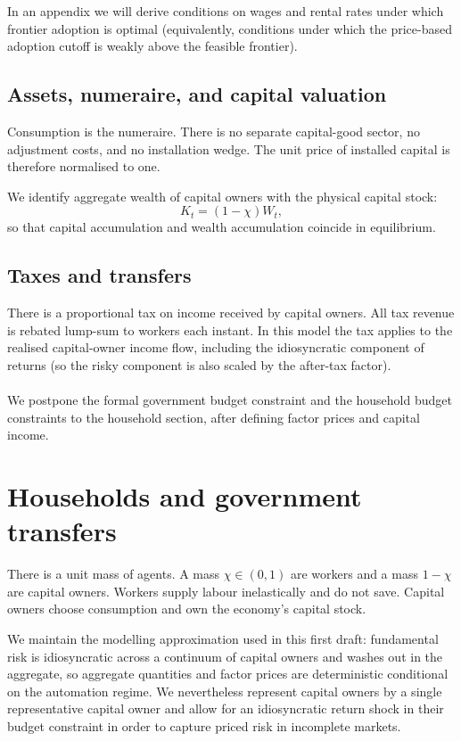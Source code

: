\documentclass{article}
\begin{document}
In an appendix we will derive conditions on wages and rental rates under which frontier adoption is optimal (equivalently, conditions under which the price-based adoption cutoff is weakly above the feasible frontier).

\subsection{Assets, numeraire, and capital valuation}

Consumption is the numeraire. There is no separate capital-good sector, no adjustment costs, and no installation wedge. The unit price of installed capital is therefore normalised to one.

We identify aggregate wealth of capital owners with the physical capital stock:
$$
K_t = (1-\chi)W_t,
$$
so that capital accumulation and wealth accumulation coincide in equilibrium.

\subsection{Taxes and transfers}

There is a proportional tax on income received by capital owners. All tax revenue is rebated lump-sum to workers each instant. In this model the tax applies to the realised capital-owner income flow, including the idiosyncratic component of returns (so the risky component is also scaled by the after-tax factor).

\paragraph{}

We postpone the formal government budget constraint and the household budget constraints to the household section, after defining factor prices and capital income.


\section{Households and government transfers}

There is a unit mass of agents. A mass $\chi \in (0,1)$ are workers and a mass $1-\chi$ are capital owners. Workers supply labour inelastically and do not save. Capital owners choose consumption and own the economy's capital stock.

We maintain the modelling approximation used in this first draft: fundamental risk is idiosyncratic across a continuum of capital owners and washes out in the aggregate, so aggregate quantities and factor prices are deterministic conditional on the automation regime. We nevertheless represent capital owners by a single representative capital owner and allow for an idiosyncratic return shock in their budget constraint in order to capture priced risk in incomplete markets.
\end{document}
